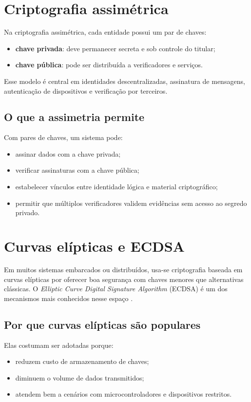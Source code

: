 \section{Criptografia assimétrica}
Na criptografia assimétrica, cada entidade possui um par de chaves:
\begin{itemize}[leftmargin=*]
  \item \textbf{chave privada}: deve permanecer secreta e sob controle do titular;
  \item \textbf{chave pública}: pode ser distribuída a verificadores e serviços.
\end{itemize}

Esse modelo é central em identidades descentralizadas, assinatura de mensagens, autenticação de dispositivos e verificação por terceiros.

\subsection{O que a assimetria permite}
Com pares de chaves, um sistema pode:
\begin{itemize}[leftmargin=*]
  \item assinar dados com a chave privada;
  \item verificar assinaturas com a chave pública;
  \item estabelecer vínculos entre identidade lógica e material criptográfico;
  \item permitir que múltiplos verificadores validem evidências sem acesso ao segredo privado.
\end{itemize}

\section{Curvas elípticas e ECDSA}
Em muitos sistemas embarcados ou distribuídos, usa-se criptografia baseada em curvas elípticas por oferecer boa segurança com chaves menores que alternativas clássicas. O \textit{Elliptic Curve Digital Signature Algorithm} (ECDSA) é um dos mecanismos mais conhecidos nesse espaço \citep{fips186_5,sp800_186}.

\subsection{Por que curvas elípticas são populares}
Elas costumam ser adotadas porque:
\begin{itemize}[leftmargin=*]
  \item reduzem custo de armazenamento de chaves;
  \item diminuem o volume de dados transmitidos;
  \item atendem bem a cenários com microcontroladores e dispositivos restritos.
\end{itemize}

